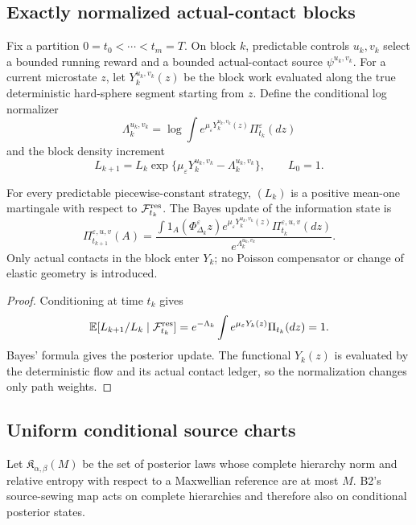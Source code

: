 \subsection{Exactly normalized actual-contact blocks}

Fix a partition \(0=t_0<\cdots<t_m=T\).  On block \(k\), predictable controls
\(u_k,v_k\) select a bounded running reward and a bounded actual-contact source
\(\psi^{u_k,v_k}\).  For a current microstate \(z\), let
\(Y_k^{u_k,v_k}(z)\) be the block work evaluated along the true deterministic
hard-sphere segment starting from \(z\).  Define the conditional log normalizer
\[
 \Lambda_k^{u_k,v_k}
 =\log\int
 e^{\mu_\varepsilon Y_k^{u_k,v_k}(z)}
 \Pi_{t_k}^\varepsilon(dz)
\]
and the block density increment
\[
 L_{k+1}=L_k
 \exp\{\mu_\varepsilon Y_k^{u_k,v_k}
       -\Lambda_k^{u_k,v_k}\},
 \qquad L_0=1.
\]

\begin{theorem}
\label{thm:r5-c1-likelihood}
For every predictable piecewise-constant strategy, \((L_k)\) is a positive
mean-one martingale with respect to \(\mathcal F_{t_k}^{\rm res}\).  The Bayes
update of the information state is
\[
 \Pi_{t_{k+1}}^{\varepsilon,u,v}(A)=
 \frac{\int 1_A(\Phi_{\Delta_k}^\varepsilon z)
       e^{\mu_\varepsilon Y_k^{u_k,v_k}(z)}
       \Pi_{t_k}^{\varepsilon,u,v}(dz)}
      {e^{\Lambda_k^{u_k,v_k}}}.
\]
Only actual contacts in the block enter \(Y_k\); no Poisson compensator or
change of elastic geometry is introduced.
\end{theorem}

\begin{proof}
Conditioning at time \(t_k\) gives
\[
 \mathbb E[L_{k+1}/L_k\mid\mathcal F_{t_k}^{\rm res}]
 =e^{-\Lambda_k}
 \int e^{\mu_\varepsilon Y_k(z)}\Pi_{t_k}(dz)=1.
\]
Bayes' formula gives the posterior update.  The functional
\(Y_k(z)\) is evaluated by the deterministic flow and its actual contact
ledger, so the normalization changes only path weights.
\end{proof}

\subsection{Uniform conditional source charts}

Let \(\mathfrak K_{\alpha,\beta}(M)\) be the set of posterior laws whose
complete hierarchy norm and relative entropy with respect to a Maxwellian
reference are at most \(M\).  B2's source-sewing map acts on complete
hierarchies and therefore also on conditional posterior states.

